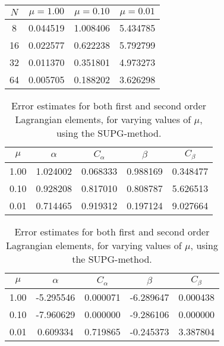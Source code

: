 \documentclass[]{article}
\begin{document}
\begin{table}[htpb]
    \begin{tabular}{cccc}
        \toprule
        {$N$} &         $\mu = 1.00$ &         $\mu = 0.10$ &       $\mu=0.01$ \\
        \midrule
        8  &  0.044519 &  1.008406 &  5.434785 \\
        16 &  0.022577 &  0.622238 &  5.792799 \\
        32 &  0.011370 &  0.351801 &  4.973273 \\
        64 &  0.005705 &  0.188202 &  3.626298 \\
        \bottomrule
    \end{tabular}
\end{table}

\begin{table}[htpb]
    \centering
    \caption{Error estimates for both first and second order Lagrangian
    elements, for varying values of $\mu$, using the SUPG-method.}
    \label{tbl:error_estimates_supg}
    
    \begin{tabular}{ccccc}
        \toprule
        {$\mu$} &    $\alpha$ &    $C_\alpha$ &      $\beta$ &    $C_\beta$ \\
        \midrule
        1.00 &  1.024002 &  0.068333 &  0.988169 &  0.348477 \\
        0.10 &  0.928208 &  0.817010 &  0.808787 &  5.626513 \\
        0.01 &  0.714465 &  0.919312 &  0.197124 &  9.027664 \\
        \bottomrule
    \end{tabular}\vspace{2em}
    \begin{tabular}{ccccc}
        \toprule
        {$\mu$} &    $\alpha$ &    $C_\alpha$ &      $\beta$ &    $C_\beta$ \\
        \midrule
        1.00 &  -5.295546 &  0.000071 &  -6.289647 &  0.000438 \\
        0.10 &  -7.960629 &  0.000000 &  -9.286106 &  0.000000 \\
        0.01 &   0.609334 &  0.719865 &  -0.245373 &  3.387804 \\
        \bottomrule
    \end{tabular}
\end{table}
\end{document}
